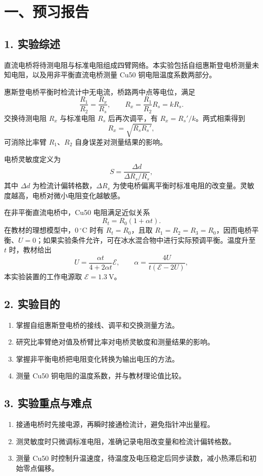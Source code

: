 \section*{一、预习报告}

\subsection*{1. 实验综述}

直流电桥将待测电阻与标准电阻组成四臂网络。本实验包括自组惠斯登电桥测量未知电阻，以及用非平衡直流电桥测量 Cu50 铜电阻温度系数两部分。

惠斯登电桥平衡时检流计中无电流，桥路两中点等电位，满足
\begin{equation}
  \frac{R_1}{R_2}=\frac{R_x}{R_s},
  \qquad R_x=\frac{R_1}{R_2}R_s=kR_s.
\end{equation}
交换待测电阻 $R_x$ 与标准电阻 $R_s$ 后再次调平，有 $R_x=R_s'/k$。两式相乘得到
\begin{equation}
  R_x=\sqrt{R_sR_s'},
\end{equation}
可消除比率臂 $R_1$、$R_2$ 自身误差对测量结果的影响。

电桥灵敏度定义为
\begin{equation}
  S=\frac{\Delta d}{\Delta R_s/R_s},
\end{equation}
其中 $\Delta d$ 为检流计偏转格数，$\Delta R_s$ 为使电桥偏离平衡时标准电阻的改变量。灵敏度越高，电桥对微小电阻变化越敏感。

在非平衡直流电桥中，Cu50 电阻满足近似关系
\begin{equation}
  R_t=R_0(1+\alpha t).
\end{equation}
在教材的理想模型中，$0\,{}^\circ\mathrm C$ 时有 $R_t=R_0$，且取 $R_1=R_2=R_3=R_0$，因而电桥平衡、$U=0$；如果实验条件允许，可在冰水混合物中进行实际预调平衡。温度升至 $t$ 时，教材给出
\begin{equation}
  U=\frac{\alpha t}{4+2\alpha t}\mathcal E,
  \qquad \alpha=\frac{4U}{t(\mathcal E-2U)},
\end{equation}
本实验装置的工作电源取 $\mathcal E=1.3\ \mathrm V$。

\subsection*{2. 实验目的}

\begin{enumerate}
  \item 掌握自组惠斯登电桥的接线、调平和交换测量方法。
  \item 研究比率臂绝对值及桥臂比率对电桥灵敏度和测量结果的影响。
  \item 掌握非平衡电桥把电阻变化转换为输出电压的方法。
  \item 测量 Cu50 铜电阻的温度系数，并与教材理论值比较。
\end{enumerate}

\subsection*{3. 实验重点与难点}

\begin{enumerate}
  \item 接通电桥时先接电源，再瞬时接通检流计，避免指针冲出量程。
  \item 测灵敏度时只微调标准电阻，准确记录电阻改变量和检流计偏转格数。
  \item 测量 Cu50 时控制升温速度，待温度及电压稳定后同步读数，减小热滞后和初始零点偏移。
\end{enumerate}
